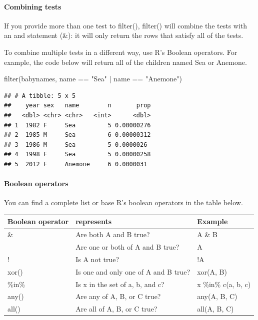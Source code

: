 \documentclass[
]{article}
\newenvironment{Shaded}{\begin{snugshade}}{\end{snugshade}}
\newcommand{\FunctionTok}[1]{\textcolor[rgb]{0.00,0.00,0.00}{#1}}
\newcommand{\NormalTok}[1]{#1}
\newcommand{\SpecialCharTok}[1]{\textcolor[rgb]{0.00,0.00,0.00}{#1}}
\newcommand{\StringTok}[1]{\textcolor[rgb]{0.31,0.60,0.02}{#1}}
\begin{document}
\hypertarget{combining-tests}{%
\paragraph{Combining tests}\label{combining-tests}}

If you provide more than one test to filter(), filter() will combine the
tests with an and statement (\&): it will only return the rows that
satisfy all of the tests.

To combine multiple tests in a different way, use R's Boolean operators.
For example, the code below will return all of the children named Sea or
Anemone.

\begin{Shaded}
\begin{Highlighting}[]
\FunctionTok{filter}\NormalTok{(babynames, name }\SpecialCharTok{==} \StringTok{"Sea"} \SpecialCharTok{|}\NormalTok{ name }\SpecialCharTok{==} \StringTok{"Anemone"}\NormalTok{)}
\end{Highlighting}
\end{Shaded}

\begin{verbatim}
## # A tibble: 5 x 5
##    year sex   name        n       prop
##   <dbl> <chr> <chr>   <int>      <dbl>
## 1  1982 F     Sea         5 0.00000276
## 2  1985 M     Sea         6 0.00000312
## 3  1986 M     Sea         5 0.0000026 
## 4  1998 F     Sea         5 0.00000258
## 5  2012 F     Anemone     6 0.0000031
\end{verbatim}

\hypertarget{boolean-operators}{%
\paragraph{Boolean operators}\label{boolean-operators}}

You can find a complete list or base R's boolean operators in the table
below.

\begin{longtable}[]{@{}lll@{}}
\toprule()
Boolean operator & represents & Example \\
\midrule()
\endhead
\& & Are both A and B true? & A \& B \\
& Are one or both of A and B true? & A \\
! & Is A not true? & !A \\
xor() & Is one and only one of A and B true? & xor(A, B) \\
\%in\% & Is x in the set of a, b, and c? & x \%in\% c(a, b, c) \\
any() & Are any of A, B, or C true? & any(A, B, C) \\
all() & Are all of A, B, or C true? & all(A, B, C) \\
\bottomrule()
\end{longtable}
\end{document}
